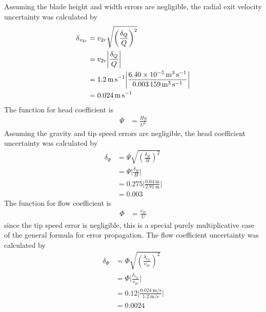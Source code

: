 Assuming the blade height and width errors are negligible, the radial exit velocity uncertainty was calculated by
\begin{align*}
    \delta_{v_{2r}} &= v_{2r} \sqrt{\left(\frac{\delta_Q}{Q}\right)^2} \\
    &= v_{2r} \bigg|\frac{\delta_Q}{Q}\bigg| \\
    &= \qty{1.2}{\meter\per\second} \bigg|\frac{\qty{6.40E-05}{\meter\cubed\per\second}}{\qty{0.003159}{\meter\cubed\per\second}}\bigg| \\
    &= \qty{0.024}{\meter\per\second}
\end{align*}
The function for head coefficient is
\begin{align*}
    \Psi &= \frac{Hg}{U^2}
\end{align*}
Assuming the gravity and tip speed errors are negligible, the head coefficient uncertainty was calculated by
\begin{align*}
    \delta_{\Psi} &= \Psi \sqrt{\left(\frac{\delta_H}{H}\right)^2} \\
    &= \Psi \bigg|\frac{\delta_H}{H}\bigg| \\
    &= 0.275 \bigg|\frac{\qty{0.04}{\meter}}{\qty{2.91}{\meter}}\bigg| \\
    &= 0.003
\end{align*}
The function for flow coefficient is
\begin{align*}
    \Phi &= \frac{v_{2r}}{U}
\end{align*}
since the tip speed error is negligible, this is a special purely multiplicative case of the general formula for error propagation. The flow coefficient uncertainty was calculated by
\begin{align*}
    \delta_{\Phi} &= \Phi \sqrt{\left(\frac{\delta_{v_{2r}}}{v_{2r}}\right)^2} \\
    &= \Phi \bigg|\frac{\delta_{v_{2r}}}{v_{2r}}\bigg| \\
    &= 0.12 \bigg|\frac{\qty{0.024}{\meter\per\second}}{\qty{1.2}{\meter\per\second}}\bigg| \\
    &= 0.0024
\end{align*}


